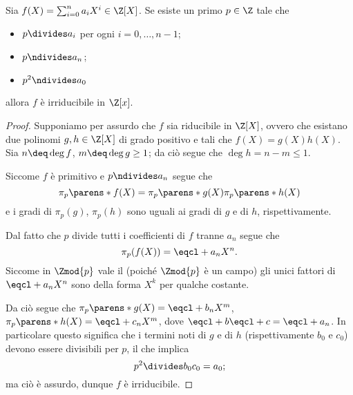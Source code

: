 \begin{proposition}
    Sia $f(X) = \sum_{i=0}^n a_iX^i \in \Z[X]$. Se esiste un primo $p \in \Z$ tale che 
    \begin{itemize}
        \item $p \divides a_i$ per ogni $i = 0, \dots, n-1$;
        \item $p \ndivides a_n$;
        \item $p^2 \ndivides a_0$
    \end{itemize}
    allora $f$ è irriducibile in $\Z[x]$.
\end{proposition}
\begin{proof}
    Supponiamo per assurdo che $f$ sia riducibile in $\Z[X]$, ovvero che esistano due polinomi $g, h \in \Z[X]$ di grado positivo e tali che $f(X) = g(X)h(X)$. Sia $n \deq \deg f$, $m \deq \deg g \geq 1$; da ciò segue che $\deg h = n - m \leq 1$.

    Siccome $f$ è primitivo e $p \ndivides a_n$ segue che \[
        \pi_p\parens*{f(X)} = \pi_p\parens*{g(X)}\pi_p\parens*{h(X)}
    \] e i gradi di $\pi_p(g)$, $\pi_p(h)$ sono uguali ai gradi di $g$ e di $h$, rispettivamente.

    Dal fatto che $p$ divide tutti i coefficienti di $f$ tranne $a_n$ segue che \[
        \pi_p(f(X)) = \eqcl+{a_n}X^n.
    \] Siccome in $\Zmod{p}$ vale il  (poiché $\Zmod{p}$ è un campo) gli unici fattori di $\eqcl+{a_n}X^n$ sono della forma $X^k$ per qualche costante. 
    
    Da ciò segue che $\pi_p\parens*{g(X)} = \eqcl+{b_n}X^m$, $\pi_p\parens*{h(X)} = \eqcl+{c_n}X^m$, dove $\eqcl+{b}\eqcl+{c} = \eqcl+{a_n}$. In particolare questo significa che i termini noti di $g$ e di $h$ (rispettivamente $b_0$ e $c_0$) devono essere divisibili per $p$, il che implica \[
        p^2 \divides b_0c_0 = a_0;
    \] ma ciò è assurdo, dunque $f$ è irriducibile.
\end{proof}